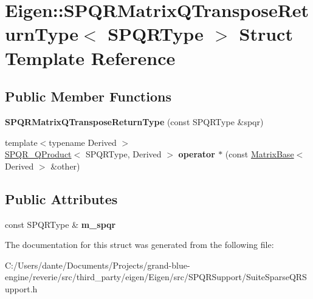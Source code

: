 \hypertarget{struct_eigen_1_1_s_p_q_r_matrix_q_transpose_return_type}{}\section{Eigen\+::S\+P\+Q\+R\+Matrix\+Q\+Transpose\+Return\+Type$<$ S\+P\+Q\+R\+Type $>$ Struct Template Reference}
\label{struct_eigen_1_1_s_p_q_r_matrix_q_transpose_return_type}
\subsection*{Public Member Functions}
\begin{DoxyCompactItemize}
\item 
\mbox{\label{struct_eigen_1_1_s_p_q_r_matrix_q_transpose_return_type_a0c31f8b070b380c416402fb1350999d7}} 
{\bfseries S\+P\+Q\+R\+Matrix\+Q\+Transpose\+Return\+Type} (const S\+P\+Q\+R\+Type \&spqr)
\item 
\mbox{\label{struct_eigen_1_1_s_p_q_r_matrix_q_transpose_return_type_ae436d3dd955bb7132c32956798eb6508}} 
{\footnotesize template$<$typename Derived $>$ }\\\mbox{\hyperlink{struct_eigen_1_1_s_p_q_r___q_product}{S\+P\+Q\+R\+\_\+\+Q\+Product}}$<$ S\+P\+Q\+R\+Type, Derived $>$ {\bfseries operator $\ast$} (const \mbox{\hyperlink{class_eigen_1_1_matrix_base}{Matrix\+Base}}$<$ Derived $>$ \&other)
\end{DoxyCompactItemize}
\subsection*{Public Attributes}
\begin{DoxyCompactItemize}
\item 
\mbox{\label{struct_eigen_1_1_s_p_q_r_matrix_q_transpose_return_type_a4f11ca2c40171dee10ed1351d40e94fc}} 
const S\+P\+Q\+R\+Type \& {\bfseries m\+\_\+spqr}
\end{DoxyCompactItemize}


The documentation for this struct was generated from the following file\+:\begin{DoxyCompactItemize}
\item 
C\+:/\+Users/dante/\+Documents/\+Projects/grand-\/blue-\/engine/reverie/src/third\+\_\+party/eigen/\+Eigen/src/\+S\+P\+Q\+R\+Support/Suite\+Sparse\+Q\+R\+Support.\+h\end{DoxyCompactItemize}
